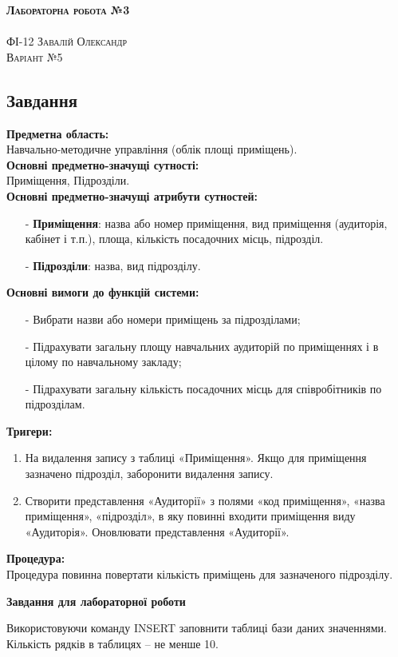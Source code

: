\documentclass[a4paper,12pt]{article}
\begin{document}
	\begin{center}
		{\Large \bfseries \textsc{Лабораторна робота №3}}\\
		\hrulefill\\
		\Large \textsc{ФІ-12 Завалій Олександр\\ Варіант №5}
	\end{center}
	\begin{center}
		\section*{\bfseries{Завдання}}
	\end{center} 
	\textbf{Предметна область:} \\
	Навчально-методичне управління (облік площі приміщень). \\
	\textbf{Основні предметно-значущі сутності:} \\
	Приміщення, Підрозділи. \\
	\textbf{Основні предметно-значущі атрибути сутностей:}
	\begin{enumerate}
		\item[-] \textbf{Приміщення}: назва або номер приміщення, вид приміщення (аудиторія, кабінет і т.п.), площа, кількість посадочних місць, підрозділ. 
		\item[-] \textbf{Підрозділи}: назва, вид підрозділу.
	\end{enumerate}
	\textbf{Основні вимоги до функцій системи:}
	\begin{enumerate}
		\item[-] Вибрати назви або номери приміщень за підрозділами;
		\item[-] Підрахувати загальну площу навчальних аудиторій по приміщеннях і в цілому по навчальному закладу;
		\item[-] Підрахувати загальну кількість посадочних місць для співробітників по підрозділам.
	\end{enumerate}
	\textbf{Тригери:}
	\begin{enumerate}
		\item На видалення запису з таблиці «Приміщення». Якщо для приміщення зазначено підрозділ, заборонити видалення запису.
		\item Створити представлення «Аудиторії» з полями «код приміщення», «назва приміщення», «підрозділ», в яку повинні входити приміщення виду «Аудиторія». Оновлювати представлення «Аудиторії».
	\end{enumerate}
	\textbf{Процедура:}\\
	Процедура повинна повертати кількість приміщень для зазначеного підрозділу. \\
	\begin{center}
		\textbf{Завдання для лабораторної роботи}
	\end{center}
	Використовуючи команду INSERT заповнити таблиці бази даних значеннями. Кількість рядків в таблицях – не менше 10.
\end{document}
